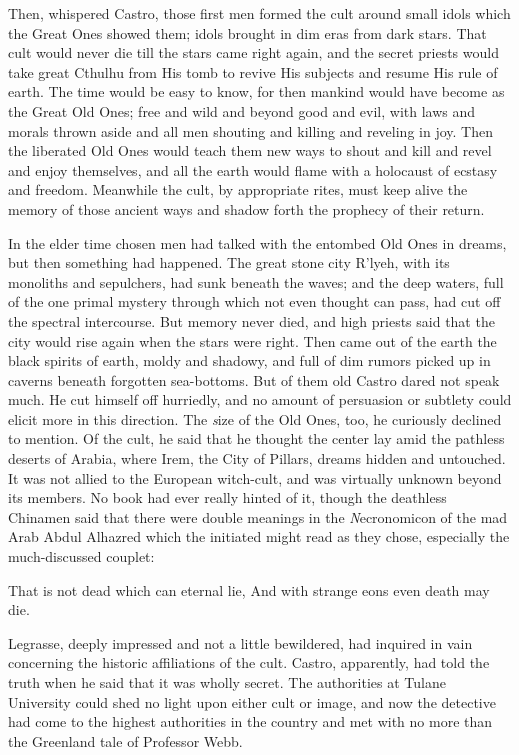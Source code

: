 Then, whispered Castro, those first men formed the cult around small idols which the Great Ones showed them; idols brought in dim eras from dark stars. That cult would never die till the stars came right again, and the secret priests would take great Cthulhu from His tomb to revive His subjects and resume His rule of earth. The time would be easy to know, for then mankind would have become as the Great Old Ones; free and wild and beyond good and evil, with laws and morals thrown aside and all men shouting and killing and reveling in joy. Then the liberated Old Ones would teach them new ways to shout and kill and revel and enjoy themselves, and all the earth would flame with a holocaust of ecstasy and freedom. Meanwhile the cult, by appropriate rites, must keep alive the memory of those ancient ways and shadow forth the prophecy of their return.

In the elder time chosen men had talked with the entombed Old Ones in dreams, but then something had happened. The great stone city R’lyeh, with its monoliths and sepulchers, had sunk beneath the waves; and the deep waters, full of the one primal mystery through which not even thought can pass, had cut off the spectral intercourse. But memory never died, and high priests said that the city would rise again when the stars were right. Then came out of the earth the black spirits of earth, moldy and shadowy, and full of dim rumors picked up in caverns beneath forgotten sea-bottoms. But of them old Castro dared not speak much. He cut himself off hurriedly, and no amount of persuasion or subtlety could elicit more in this direction. The {\emph size} of the Old Ones, too, he curiously declined to mention. Of the cult, he said that he thought the center lay amid the pathless deserts of Arabia, where Irem, the City of Pillars, dreams hidden and untouched. It was not allied to the European witch-cult, and was virtually unknown beyond its members. No book had ever really hinted of it, though the deathless Chinamen said that there were double meanings in the {\emph Necronomicon} of the mad Arab Abdul Alhazred which the initiated might read as they chose, especially the much-discussed couplet:

\beginblockquote
{
\noindent That is not dead which can eternal lie,\hfil\break
And with strange eons even death may die.
}
\endblockquote

Legrasse, deeply impressed and not a little bewildered, had inquired in vain concerning the historic affiliations of the cult. Castro, apparently, had told the truth when he said that it was wholly secret. The authorities at Tulane University could shed no light upon either cult or image, and now the detective had come to the highest authorities in the country and met with no more than the Greenland tale of Professor Webb.

